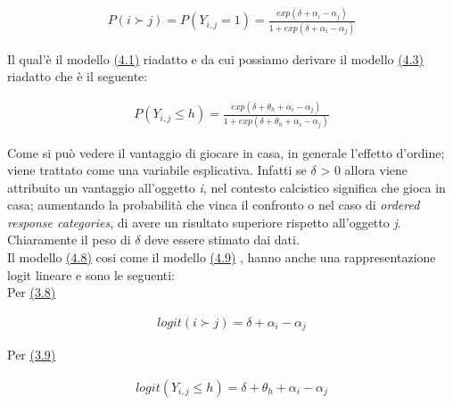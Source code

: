 \begin{align} 
	P(i\succ j) = P(Y_{i,j} = 1) = \frac{exp(\delta + \alpha_{i} - \alpha_{j})}{1 + exp(\delta + \alpha_{i} - \alpha_{j})} \label{for:3.8} 
\end{align}

Il qual'è il modello \hyperref[for:3.1]{(4.1)} riadatto e da cui possiamo derivare il modello \hyperref[for:3.2.1]{(4.3)} riadatto che è il seguente:

\begin{align}
	P(Y_{i,j}\leq h) =  \frac{exp(\delta + \theta_{h} + \alpha_{i} - \alpha_{j})}{1 + exp(\delta + \theta_{h} + \alpha_{i} - \alpha_{j})} \label{for:3.9}
\end{align}

Come si può vedere il vantaggio di giocare in casa, in generale l'effetto d'ordine; viene trattato come una variabile esplicativa. Infatti se $\delta$ > 0 allora viene attribuito un vantaggio all'oggetto \textit{i}, nel contesto calcistico significa che gioca in casa; aumentando la probabilità che vinca il confronto o nel caso di \emph{ordered response categories}, di avere un risultato superiore rispetto all'oggetto \textit{j}. Chiaramente il peso di $\delta$ deve essere stimato dai dati.\\

Il modello \hyperref[for:3.8]{(4.8)} cosi come il modello \hyperref[for:3.9]{(4.9)} , hanno anche una rappresentazione logit lineare e sono le seguenti:\\

Per \hyperref[for:3.8]{(3.8)}

\begin{align}
	logit(i \succ j) =  \delta + \alpha_i - \alpha_j 
\end{align}

Per \hyperref[for:3.9]{(3.9)}

\begin{align}
	logit(Y_{i,j}\leq h) =  \delta + \theta_{h} + \alpha_i - \alpha_j 
\end{align}
	